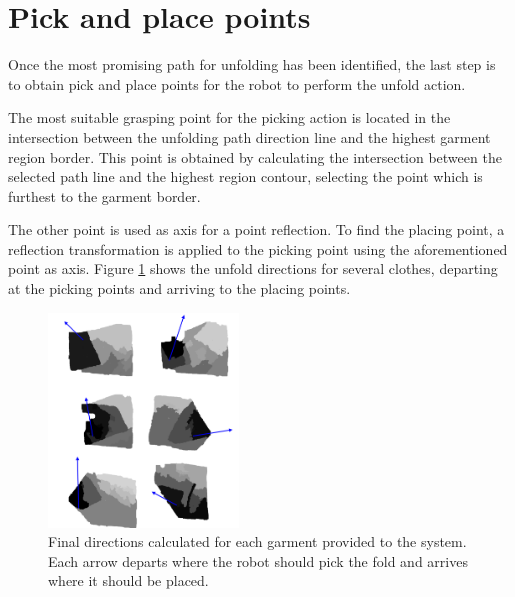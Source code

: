 \section{Pick and place points}
\label{pick_and_place}
Once the most promising path for unfolding has been identified, the last step is to obtain pick and place points for the robot to perform the unfold action.

The most suitable grasping point for the picking action is located in the  intersection between the unfolding path direction line and the highest garment region border. This point is obtained by calculating the intersection between the selected path line and the highest region contour, selecting the point which is furthest to the garment border.

The other point is used as axis for a point reflection. To find the placing point, a reflection transformation is applied to the picking point using the aforementioned point as axis. Figure \ref{fig:directions} shows the unfold directions for several clothes, departing at the picking points and arriving to the placing points.

\begin{figure}[thpb]
    \centering
    \includegraphics[width=0.45\textwidth]{figures/directions.pdf}
    \caption{Final directions calculated for each garment provided to the system. Each arrow departs where the robot should pick the fold and arrives where it should be placed.}
    \label{fig:directions}
\end{figure}